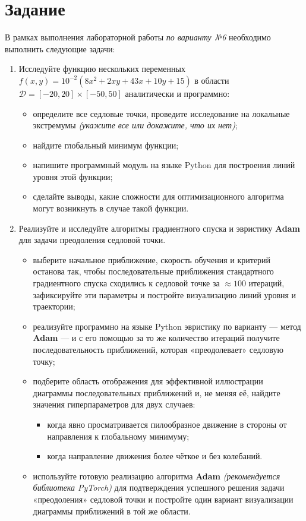 \section{Задание}

В рамках выполнения лабораторной работы \textit{по варианту №6} необходимо выполнить следующие задачи:

\begin{enumerate}
  \item Исследуйте функцию нескольких переменных $f(x, y) = 10^{-2}(8x^2 + 2xy + 43x + 10y + 15)$ в области \( \mathcal{D}=[-20,20]\times[-50,50] \) аналитически и программно:
  \begin{itemize}
    \item определите все седловые точки, проведите исследование на локальные экстремумы \textit{(укажите все или докажите, что их нет)};
    \item найдите глобальный минимум функции;
    \item напишите программный модуль на языке Python для построения линий уровня этой функции;
    \item сделайте выводы, какие сложности для оптимизационного алгоритма могут возникнуть в случае такой функции.
  \end{itemize}

  \item Реализуйте и исследуйте алгоритмы градиентного спуска и эвристику \textbf{Adam} для задачи преодоления седловой точки.
  \begin{itemize}
    \item выберите начальное приближение, скорость обучения и критерий останова так, чтобы последовательные приближения стандартного градиентного спуска сходились к седловой точке за $\approx 100$ итераций, зафиксируйте эти параметры и постройте визуализацию линий уровня и траектории;
    \item реализуйте программно на языке Python эвристику по варианту --- метод \textbf{Adam} --- и с его помощью за то же количество итераций получите последовательность приближений, которая «преодолевает» седловую точку;
    \item подберите область отображения для эффективной иллюстрации диаграммы последовательных приближений и, не меняя её, найдите значения гиперпараметров для двух случаев:
    \begin{itemize}
      \item когда явно просматривается пилообразное движение в стороны от направления к глобальному минимуму;
      \item когда направление движения более чёткое и без колебаний.
    \end{itemize}
    \item используйте готовую реализацию алгоритма \textbf{Adam} \textit{(рекомендуется библиотека PyTorch)} для подтверждения успешного решения задачи «преодоления» седловой точки и постройте один вариант визуализации диаграммы приближений в той же области.
  \end{itemize}
\end{enumerate}